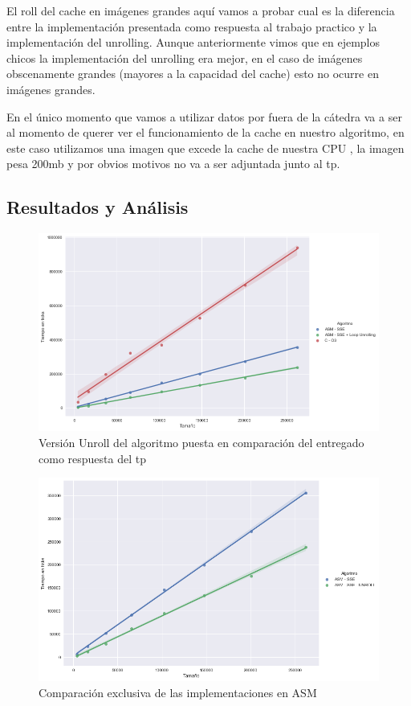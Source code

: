 El roll del cache en imágenes grandes aquí vamos a probar cual es la diferencia entre la implementación presentada como respuesta al trabajo practico y la implementación del unrolling. Aunque anteriormente vimos que en ejemplos chicos la implementación del unrolling era mejor, en el caso de imágenes obscenamente grandes (mayores a la capacidad del cache) esto no ocurre en imágenes grandes.

En el único momento que vamos a utilizar datos por fuera de la cátedra va a ser al momento de querer ver el funcionamiento de la cache en nuestro algoritmo, en este caso utilizamos una imagen que excede la cache de nuestra CPU , la imagen pesa 200mb y por obvios motivos no va a ser adjuntada junto al tp.

\subsection{Resultados y Análisis}

\begin{figure}[H]
	\centering
	\includegraphics[scale=0.5]{img/fourCombine_UnrollvsNormal.png}
	\caption{Versión Unroll del algoritmo puesta en comparación del entregado como respuesta del tp}
	\label{fourCombine_unroolvsnormal}
\end{figure}

\begin{figure}[H]
	\centering
	\includegraphics[scale=0.5]{img/fourCombine_UnrollvsNormal_asmOnly.png}
	\caption{Comparación exclusiva de las implementaciones en ASM}
	\label{fourCombine_unroolvsnormal_asmOnly}
\end{figure}

